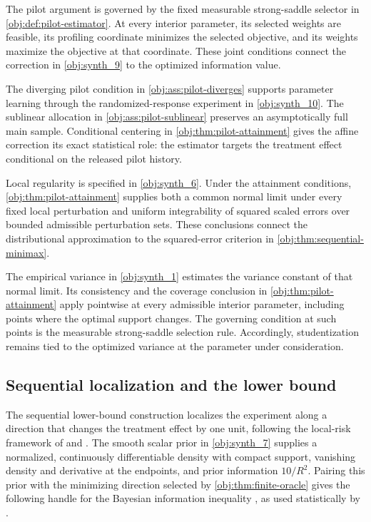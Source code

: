 \documentclass[11pt]{article}
\begin{document}
The pilot argument is governed by the fixed measurable strong-saddle selector in \cref{obj:def:pilot-estimator}. At every interior parameter, its selected weights are feasible, its profiling coordinate minimizes the selected objective, and its weights maximize the objective at that coordinate. These joint conditions connect the correction in \cref{obj:synth_9} to the optimized information value.

The diverging pilot condition in \cref{obj:ass:pilot-diverges} supports parameter learning through the randomized-response experiment in \cref{obj:synth_10}. The sublinear allocation in \cref{obj:ass:pilot-sublinear} preserves an asymptotically full main sample. Conditional centering in \cref{obj:thm:pilot-attainment} gives the affine correction its exact statistical role: the estimator targets the treatment effect conditional on the released pilot history.

Local regularity is specified in \cref{obj:synth_6}. Under the attainment conditions, \cref{obj:thm:pilot-attainment} supplies both a common normal limit under every fixed local perturbation and uniform integrability of squared scaled errors over bounded admissible perturbation sets. These conclusions connect the distributional approximation to the squared-error criterion in \cref{obj:thm:sequential-minimax}.

The empirical variance in \cref{obj:synth_1} estimates the variance constant of that normal limit. Its consistency and the coverage conclusion in \cref{obj:thm:pilot-attainment} apply pointwise at every admissible interior parameter, including points where the optimal support changes. The governing condition at such points is the measurable strong-saddle selection rule. Accordingly, studentization remains tied to the optimized variance at the parameter under consideration.

\subsection{Sequential localization and the lower bound}

The sequential lower-bound construction localizes the experiment along a direction that changes the treatment effect by one unit, following the local-risk framework of \citet[Chapter 6]{LeCam2000} and \citet[Chapters 7--8 and 25]{VanDerVaart1998}. The smooth scalar prior in \cref{obj:synth_7} supplies a normalized, continuously differentiable density with compact support, vanishing density and derivative at the endpoints, and prior information \(10/R^2\). Pairing this prior with the minimizing direction selected by \cref{obj:thm:finite-oracle} gives the following handle for the Bayesian information inequality \citep{VanTrees2001}, as used statistically by \citet[pp. 59--79]{Gill1995}.
\end{document}

